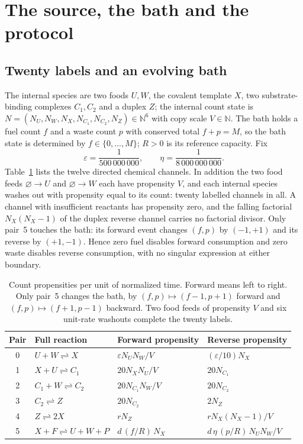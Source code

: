 \documentclass[11pt,a4paper]{article}
\theoremstyle{plain}
\theoremstyle{definition}
\theoremstyle{remark}
\newcommand{\N}{\mathbb N}
\newcommand{\eps}{\varepsilon}
\begin{document}
\section{The source, the bath and the protocol}\label{sec:model}

\subsection{Twenty labels and an evolving bath}\label{sec:source}

The internal species are two foods $U,W$, the covalent template $X$, two substrate-binding complexes $C_1,C_2$ and a duplex $Z$; the internal count state is $N=(N_U,N_W,N_X,N_{C_1},N_{C_2},N_Z)\in\N^6$ with copy scale $V\in\N$. The bath holds a fuel count $f$ and a waste count $p$ with conserved total $f+p=M$, so the bath state is determined by $f\in\{0,\dots,M\}$; $R>0$ is its reference capacity. Fix
\begin{equation}\label{eq:parameters}
\eps=\frac1{500\,000\,000},\qquad \eta=\frac1{8\,000\,000\,000}.
\end{equation}
Table~\ref{tab:rates} lists the twelve directed chemical channels. In addition the two food feeds $\varnothing\to U$ and $\varnothing\to W$ each have propensity $V$, and each internal species washes out with propensity equal to its count: twenty labelled channels in all. A channel with insufficient reactants has propensity zero, and the falling factorial $N_X(N_X-1)$ of the duplex reverse channel carries no factorial divisor. Only pair~5 touches the bath: its forward event changes $(f,p)$ by $(-1,+1)$ and its reverse by $(+1,-1)$. Hence zero fuel disables forward consumption and zero waste disables reverse consumption, with no singular expression at either boundary.

\begin{table}[tb]
\centering\small
\begin{tabular}{clll}
\toprule
Pair & Full reaction & Forward propensity & Reverse propensity\\
\midrule
0 & $U+W\rightleftharpoons X$ & $\eps N_UN_W/V$ & $(\eps/10)N_X$\\
1 & $X+U\rightleftharpoons C_1$ & $20N_XN_U/V$ & $20N_{C_1}$\\
2 & $C_1+W\rightleftharpoons C_2$ & $20N_{C_1}N_W/V$ & $20N_{C_2}$\\
3 & $C_2\rightleftharpoons Z$ & $20N_{C_2}$ & $2N_Z$\\
4 & $Z\rightleftharpoons 2X$ & $rN_Z$ & $rN_X(N_X-1)/V$\\
5 & $X+F\rightleftharpoons U+W+P$ & $d\,(f/R)\,N_X$ & $d\,\eta\,(p/R)\,N_UN_W/V$\\
\bottomrule
\end{tabular}
\caption{Count propensities per unit of normalized time. Forward means left to right. Only pair~5 changes the bath, by $(f,p)\mapsto(f-1,p+1)$ forward and $(f,p)\mapsto(f+1,p-1)$ backward. Two food feeds of propensity $V$ and six unit-rate washouts complete the twenty labels.}
\label{tab:rates}
\end{table}
\end{document}
